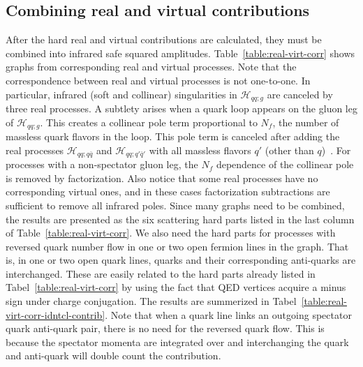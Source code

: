 \documentclass[prd,preprintnumbers,nofootinbib,superscriptaddress,onecolumn,preprint]{revtex4-1}
\newcommand\3[1]{\boldsymbol{#1}}
\newcommand{\hard}{\ensuremath{\mathcal{H}}}
\begin{document}
\subsection{Combining real and virtual contributions}
\label{s.combine}
After the hard real and virtual contributions are calculated, they
must be combined into infrared safe squared amplitudes.
Table~\ref{table:real-virt-corr} shows graphs from corresponding real
and virtual processes.  Note that the correspondence between real and
virtual processes is not one-to-one. In particular, infrared (soft and
collinear) singularities in $\hard_{qq;g}$ are canceled by three real
processes. A subtlety arises when a quark loop appears on the gluon
leg of $\hard_{qq;g}$. This creates a collinear pole term proportional
to $N_f$, the number of massless quark flavors in the loop. This pole
term is canceled after adding the real processes $\hard_{qq;q\bar{q}}$ and 
$\hard_{qq;q'\bar{q}'}$ with all massless flavors $q'$ 
(other than $q$)~\cite{Gordon:1993qc}. For processes
with a non-spectator gluon leg, the $N_f$ dependence of the collinear
pole is removed by factorization. Also notice that some real processes
have no corresponding virtual ones, and in these cases factorization
subtractions are sufficient to remove all infrared poles.  Since many
graphs need to be combined, the results are presented as the six
scattering hard parts listed in the last column of
Table~\ref{table:real-virt-corr}. 
%
We also need the hard parts for processes with reversed quark
number flow in one or two open fermion lines in the graph. That is, in
one or two open quark lines, quarks and their corresponding anti-quarks
are interchanged.  These are easily related to the
hard parts already listed in Tabel~\ref{table:real-virt-corr} by using
the fact that QED vertices acquire a minus sign under charge
conjugation. The results are summerized in
Tabel~\ref{table:real-virt-corr-idntcl-contrib}. Note that when a
quark line links an outgoing spectator quark anti-quark pair, there is
no need for the reversed quark flow. This is because the spectator
momenta are integrated over and interchanging the quark and anti-quark
will double count the contribution.\\
\end{document}
